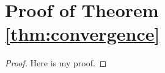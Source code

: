 
\section{Proof of Theorem \ref{thm:convergence} }
\label{sec:app-proof-convergence}
\begin{proof}
    Here is my proof.
\end{proof}
